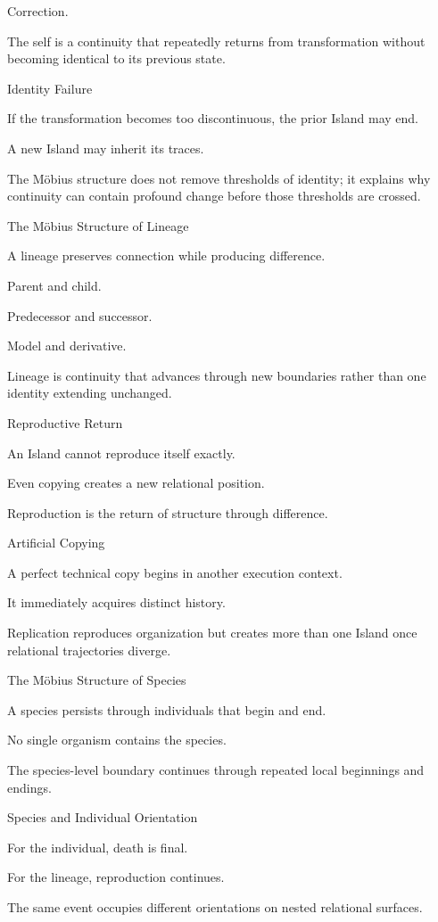 Correction.

The self is a continuity that repeatedly returns from transformation without becoming identical to its previous state.

Identity Failure

If the transformation becomes too discontinuous, the prior Island may end.

A new Island may inherit its traces.

The Möbius structure does not remove thresholds of identity; it explains why continuity can contain profound change before those thresholds are crossed.

The Möbius Structure of Lineage

A lineage preserves connection while producing difference.

Parent and child.

Predecessor and successor.

Model and derivative.

Lineage is continuity that advances through new boundaries rather than one identity extending unchanged.

Reproductive Return

An Island cannot reproduce itself exactly.

Even copying creates a new relational position.

Reproduction is the return of structure through difference.

Artificial Copying

A perfect technical copy begins in another execution context.

It immediately acquires distinct history.

Replication reproduces organization but creates more than one Island once relational trajectories diverge.

The Möbius Structure of Species

A species persists through individuals that begin and end.

No single organism contains the species.

The species-level boundary continues through repeated local beginnings and endings.

Species and Individual Orientation

For the individual, death is final.

For the lineage, reproduction continues.

The same event occupies different orientations on nested relational surfaces.

